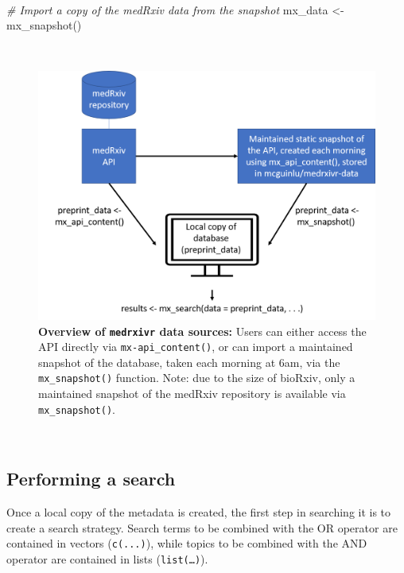 \documentclass[a4paper, twoside]{templates/ociamthesis}
\newenvironment{Shaded}{\begin{snugshade}}{\end{snugshade}}
\newcommand{\CommentTok}[1]{\textcolor[rgb]{0.56,0.35,0.01}{\textit{#1}}}
\newcommand{\FunctionTok}[1]{\textcolor[rgb]{0.00,0.00,0.00}{#1}}
\newcommand{\NormalTok}[1]{#1}
\newcommand{\OtherTok}[1]{\textcolor[rgb]{0.56,0.35,0.01}{#1}}
\renewenvironment{Shaded}
{
  \vspace{4pt}%
  \begin{snugshade}%
}{%
  \end{snugshade}%
  \vspace{4pt}%
}
\begin{document}
~

\begin{Shaded}
\begin{Highlighting}[]
\CommentTok{\# Import a copy of the medRxiv data from the snapshot}
\NormalTok{mx\_data }\OtherTok{\textless{}{-}} \FunctionTok{mx\_snapshot}\NormalTok{()}
\end{Highlighting}
\end{Shaded}

~





\begin{figure}[!h]
\includegraphics[width=1\linewidth]{figures/sys-rev-tools/data_sources} \caption[Overview of \texttt{medrxivr} data sources]{\textbf{Overview of \texttt{medrxivr} data sources:} Users can either access the API directly via \texttt{mx-api\_content()}, or can import a maintained snapshot of the database, taken each morning at 6am, via the \texttt{mx\_snapshot()} function. Note: due to the size of bioRxiv, only a maintained snapshot of the medRxiv repository is available via \texttt{mx\_snapshot()}.}\label{fig:medrxivr-data-sources}
\end{figure}

~

\hypertarget{performing-a-search}{%
\subsection{Performing a search}\label{performing-a-search}}

Once a local copy of the metadata is created, the first step in searching it is to create a search strategy. Search terms to be combined with the OR operator are contained in vectors (\texttt{c(...)}), while topics to be combined with the AND operator are contained in lists (\texttt{list(\ldots{})}).
\end{document}
